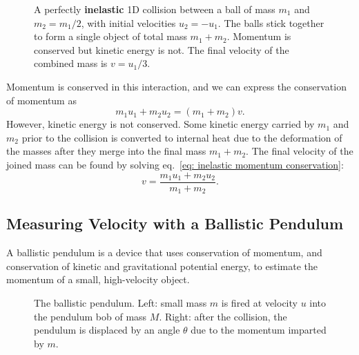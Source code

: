 \documentclass[addpoints]{physlabs}
\begin{document}
\begin{labsection}
\begin{theory}
    \begin{figure}[ht]
        \centering
        
        \caption{A perfectly \textbf{inelastic} 1D collision between a ball of mass $m_1$ and $m_2=m_1/2$, with initial velocities $u_2=-u_1$. The balls stick together to form a single object of total mass $m_1+m_2$. Momentum is conserved but kinetic energy is not. The final velocity of the combined mass is $v=u_1/3$.}
        \label{fig: inelastic collision}
    \end{figure}

    \noindent
    Momentum is conserved in this interaction, and we can express the conservation of momentum as
    \begin{equation}\label{eq: inelastic momentum conservation}
        m_1u_1 + m_2u_2 = (m_1+m_2)v.
    \end{equation}
    However, kinetic energy is not conserved. Some kinetic energy carried by $m_1$ and $m_2$ prior to the collision is converted to internal heat due to the deformation of the masses after they merge into the final mass $m_1+m_2$. The final velocity of the joined mass can be found by solving eq.~\ref{eq: inelastic momentum conservation}:
    \begin{equation}\label{eq: inelastic collision final velocity}
        v = \frac{m_1u_1 + m_2u_2}{m_1+m_2}.
    \end{equation}

    \subsection*{Measuring Velocity with a Ballistic Pendulum}

    A ballistic pendulum is a device that uses conservation of momentum, and conservation of kinetic and gravitational potential energy, to estimate the momentum of a small, high-velocity object.

    \begin{figure}[ht]
        \centering
        
        \caption{The ballistic pendulum. Left: small mass $m$ is fired at velocity $u$ into the pendulum bob of mass $M$. Right: after the collision, the pendulum is displaced by an angle $\theta$ due to the momentum imparted by $m$.}
        \label{fig: ballistic pendulum}
    \end{figure}


\end{theory}
\end{labsection}
\end{document}

